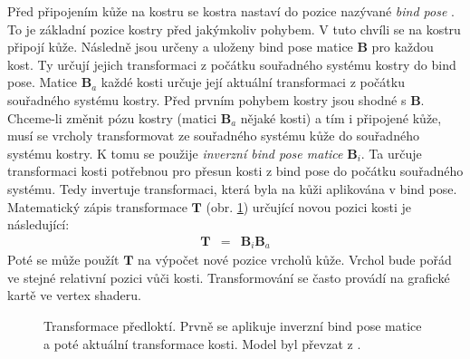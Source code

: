 Před připojením kůže na kostru se kostra nastaví do pozice nazývané \textit{bind pose} \cite{bindPose}. To je základní pozice kostry před jakýmkoliv pohybem. V tuto chvíli se na kostru připojí kůže. Následně jsou určeny a uloženy bind pose matice $\mathbf{B}$ pro každou kost. Ty určují jejich transformaci z počátku souřadného systému kostry do bind pose. Matice $\mathbf{B}_a$ každé kosti určuje její aktuální transformaci z počátku souřadného systému kostry. Před prvním pohybem kostry jsou shodné s $\mathbf{B}$. Chceme-li změnit pózu kostry (matici $\mathbf{B}_a$ nějaké kosti) a tím i připojené kůže, musí se vrcholy transformovat ze souřadného systému kůže do souřadného systému kostry. K tomu se použije \textit{inverzní bind pose matice} $\mathbf{B}_i$. Ta určuje transformaci kosti potřebnou pro přesun kosti z bind pose do počátku souřadného systému. Tedy invertuje transformaci, která byla na kůži aplikována v bind pose. Matematický zápis transformace $\mathbf{T}$ (obr. \ref{transform_pose}) určující novou pozici kosti je následující:
\begin{eqnarray}
\mathbf{T} &=& \mathbf{B}_i \mathbf{B}_a\label{r.transform_mat}
\end{eqnarray}
Poté se může použít $\mathbf{T}$ na výpočet nové pozice vrcholů kůže. Vrchol bude pořád ve stejné relativní pozici vůči kosti. Transformování se často provádí na grafické kartě ve vertex shaderu.
 \begin{figure}[h]
\begin{center}
\caption{Transformace předloktí. Prvně se aplikuje inverzní bind pose matice a poté aktuální transformace kosti. Model byl převzat z \cite{venom}.} \label{transform_pose}
\end{center}
\end{figure}
